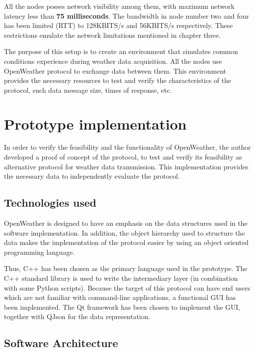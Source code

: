 All the nodes posses network visibility among them, with maximum network latency less than \textbf{75 milliseconds}. The bandwidth in node number two and four has been limited (\gls{RTT}) to 128\gls{KBITS}/s and 56\gls{KBITS}/s respectively. These restrictions emulate the network limitations mentioned in chapter three.

The purpose of this setup is to create an environment that simulates common conditions experience during weather data acquisition. All the nodes use OpenWeather protocol to exchange data between them. This environment provides the necessary resources to test and verify the characteristics of the protocol, such data message size, times of response, etc.

\section{Prototype implementation}

In order to verify the feasibility and the functionality of OpenWeather, the author developed a proof of concept of the protocol, to test and verify its feasibility as alternative protocol for weather data transmission. This implementation provides the necessary data to independently evaluate the protocol.

\subsection{Technologies used}

OpenWeather is designed to have an emphasis on the data structures used in the software implementation. In addition, the object hierarchy used to structure the data makes the implementation of the protocol easier by using an object oriented programming language.

Thus, C++ has been chosen as the primary language used in the prototype. The C++ standard library is used to write the intermediary layer (in combination with some Python scripts). Because the target of this protocol can have end users which are not familiar with command-line applications, a functional \gls{GUI} has been implemented. The Qt framework\cite{QT} has been chosen to implement the \gls{GUI}, together with QJson\cite{QSJON} for the data representation.

\subsection{Software Architecture}

